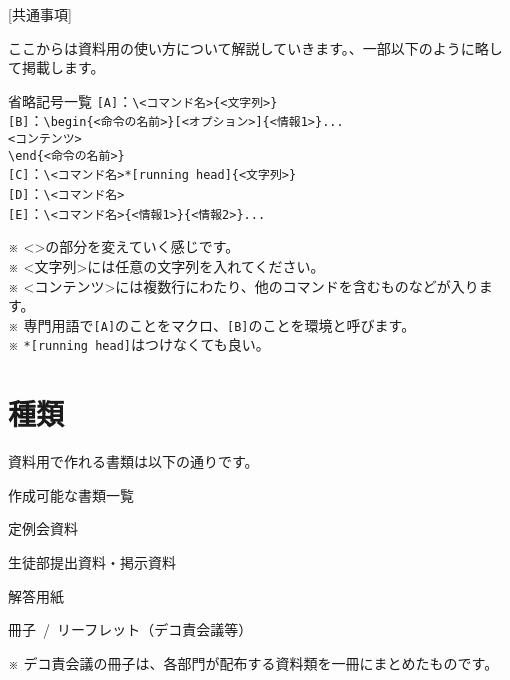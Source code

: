 \newpage
\pagestyle{leaflet}
[共通事項]
\begin{multicols*}{2}
ここからは資料用\BunTeX の使い方について解説していきます。、一部以下のように略して掲載します。

\begin{framebox-simple}{省略記号一覧}
\noindent\verb|[A]|：\verb|\<コマンド名>{<文字列>}|\\
\noindent\verb|[B]|：\verb|\begin{<命令の名前>}[<オプション>]{<情報1>}...|\\\hspace{4.5\zw}\verb|<コンテンツ>|\\\hspace{2.4\zw}\verb|\end{<命令の名前>}|\\
\noindent\verb|[C]|：\verb|\<コマンド名>*[running head]{<文字列>}|\\
\noindent\verb|[D]|：\verb|\<コマンド名>|\\
\noindent\verb|[E]|：\verb|\<コマンド名>{<情報1>}{<情報2>}...|
\end{framebox-simple}
\noindent ※ <>の部分を変えていく感じです。\\
\noindent ※ <文字列>には任意の文字列を入れてください。\\
\noindent ※ <コンテンツ>には複数行にわたり、他のコマンドを含むものなどが入ります。\\
\noindent ※ 専門用語で\verb|[A]|のことをマクロ、\verb|[B]|のことを環境と呼びます。\\
\noindent ※ \verb|*[running head]|はつけなくても良い。

\section{種類}
資料用\BunTeX で作れる書類は以下の通りです。
\begin{framebox-simple}{作成可能な書類一覧}
    \begin{reitemize}
        \item 定例会資料
        \item 生徒部提出資料・掲示資料
        \item 解答用紙
        \item 冊子~/~リーフレット（デコ責会議等）
    \end{reitemize}
\end{framebox-simple}
\indent ※ デコ責会議の冊子は、各部門が配布する資料類を一冊にまとめたものです。


\end{multicols*}
